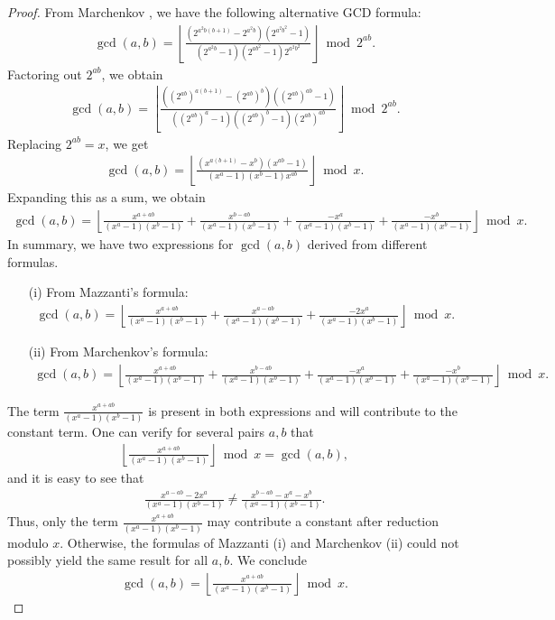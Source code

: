 \documentclass{article}
\theoremstyle{plain}
\theoremstyle{definition}
\newcommand{\floor}[1]{\left\lfloor #1 \right\rfloor}
\begin{document}
\begin{proof}
From Marchenkov \cite{marchenkov2007superposition}, we have the following alternative GCD formula:
\begin{align*}
\gcd(a,b)
= \floor{\frac
{
    (2^{a^2 b (b+1)} - 2^{a^2 b})(2^{a^2 b^2}-1)
}
{
    (2^{a^2 b}-1)(2^{ab^2}-1)2^{a^2 b^2}
}} \bmod 2^{ab} .
\end{align*}
Factoring out $2^{ab}$, we obtain
\begin{align*}
\gcd(a,b)
= \floor{\frac
{
    ((2^{ab})^{a(b+1)} - (2^{ab})^b)((2^{ab})^{ab}-1)
}
{
    ((2^{ab})^a-1)((2^{ab})^b-1) (2^{ab})^{ab}
}} \bmod 2^{ab} .
\end{align*}
Replacing $2^{ab} = x$, we get
\begin{align*}
\gcd(a,b)
= \floor
{
    \frac
    {
        (x^{a(b+1)} - x^b)(x^{ab}-1)
    }
    {
        (x^a-1)(x^b-1)x^{ab}
    }
} \bmod x .
\end{align*}
Expanding this as a sum, we obtain
\begin{align*}
\gcd(a,b) =
\floor
{
    \frac{ x^{a+ab} }{ (x^a-1)(x^b-1) }
    + \frac{ x^{b-ab} }{ (x^a-1)(x^b-1) }
    + \frac{ -x^a }{ (x^a-1)(x^b-1) }
    + \frac{ -x^b }{ (x^a-1)(x^b-1) }
}
 \bmod x .
\end{align*}
In summary, we have two expressions for $\gcd(a,b)$ derived from different formulas.
\begin{enumerate}
\item[(i)] From Mazzanti's formula:
\begin{align*}
\gcd(a,b) =
\floor
{
    \frac{ x^{a+ab} }{ (x^a-1)(x^b-1) }
    + \frac{ x^{a-ab} }{ (x^a-1)(x^b-1) }
    + \frac{ -2x^a }{ (x^a-1)(x^b-1) }
}
 \bmod x .
\end{align*}
\item[(ii)] From Marchenkov's formula:
\begin{align*}
\gcd(a,b) =
\floor
{
    \frac{ x^{a+ab} }{ (x^a-1)(x^b-1) }
    + \frac{ x^{b-ab} }{ (x^a-1)(x^b-1) }
    + \frac{ -x^a }{ (x^a-1)(x^b-1) }
    + \frac{ -x^b }{ (x^a-1)(x^b-1) }
}
 \bmod x .
\end{align*}
\end{enumerate}
The term $\frac{ x^{a+ab} }{ (x^a-1)(x^b-1) }$ is present in both expressions and will contribute to the constant term. One can verify for several pairs $a,b$ that
\begin{align*}
\floor{ \frac{ x^{a+ab} }{ (x^a-1)(x^b-1) } } \bmod x = \gcd(a,b) ,
\end{align*}
and it is easy to see that
\begin{align*}
\frac{x^{a-ab} - 2x^a}{(x^a-1)(x^b-1)} \not= \frac{x^{b-ab} - x^a - x^b}{(x^a-1)(x^b-1)} .
\end{align*}
Thus, only the term $\frac{ x^{a+ab} }{ (x^a-1)(x^b-1) }$ may contribute a constant after reduction modulo $x$. Otherwise, the formulas of Mazzanti (i) and Marchenkov (ii) could not possibly yield the same result for all $a,b$. We conclude
\begin{align*}
\gcd(a,b) = \floor{\frac{x^{a+ab}}{(x^a-1)(x^b-1)}}\bmod x .
\end{align*}
\end{proof}
\end{document}
